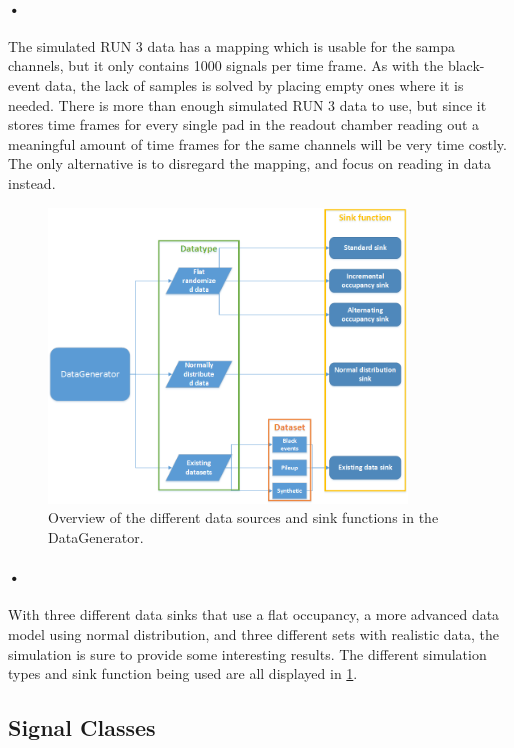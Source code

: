 \documentclass[a4paper, 12pt]{report}
\begin{document}
\paragraph{•}
The simulated RUN 3 data has a mapping which is usable for the \gls{sampa} channels, but it only contains 1000 signals per time frame.
As with the black-event data, the lack of samples is solved by placing empty ones where it is needed.
There is more than enough simulated RUN 3 data to use, but since it stores time frames for every single pad in the readout chamber reading out a meaningful amount of time frames for the same channels will be very time costly.
The only alternative is to disregard the mapping, and focus on reading in data instead.

\begin{figure}[h!]
	\centering
		\includegraphics[width=0.85\textwidth]{images/dg-overview.png}
		\caption{Overview of the different data sources and sink functions in the DataGenerator.}
		\label{fig:dg-overview}
\end{figure}

\paragraph{•}
With three different data sinks that use a flat occupancy, a more advanced data model using normal distribution, and three different sets with realistic data, the simulation is sure to provide some interesting results.
The different simulation types and sink function being used are all displayed in \ref{fig:dg-overview}.

\subsection{Signal Classes}
\label{subsec:signal-classes}
\end{document}
